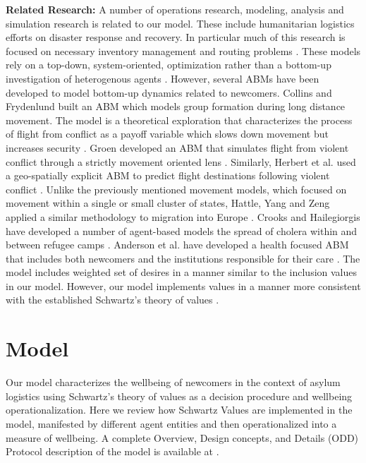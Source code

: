 \documentclass{scspaperproc}
\theoremstyle{scsthe}
\begin{document}
{\bf Related Research:} A number of operations research, modeling, analysis and simulation research is related to our model. These include humanitarian logistics efforts on disaster response and recovery. In particular much of this research is focused on necessary inventory management and routing problems \cite{67}. These models rely on a top-down, system-oriented, optimization rather than a bottom-up investigation of heterogenous agents \cite{13,31,34}. However, several ABMs have been developed to model bottom-up dynamics related to newcomers. Collins and Frydenlund built an ABM which models group formation during long distance movement. The model is a theoretical exploration that characterizes the process of flight from conflict as a payoff variable which slows down movement but increases security \cite{22}. Groen developed an ABM that simulates flight from violent conflict through a strictly movement oriented lens \cite{37}. Similarly, Herbert et al. used a geo-spatially explicit ABM to predict flight destinations following violent conflict \cite{43}. Unlike the previously mentioned movement models, which focused on movement within a single or small cluster of states, Hattle, Yang and Zeng applied a similar methodology to migration into Europe \cite{42}. Crooks and Hailegiorgis have developed a number of agent-based models the spread of cholera within and between refugee camps \cite{28,38}. Anderson et al. have developed a health focused ABM that includes both newcomers and the institutions responsible for their care \cite{4}. The model includes weighted set of desires in a manner similar to the inclusion values in our model. However, our model implements values in a manner more consistent with the established Schwartz's theory of values \cite{phil.masters.thesis}.

\section{Model}

Our model characterizes the wellbeing of newcomers in the context of asylum logistics using Schwartz's theory of values as a decision procedure and wellbeing operationalization. Here we review how Schwartz Values are implemented in the model, manifested by different agent entities and then operationalized into a measure of wellbeing. A complete Overview, Design concepts, and Details (ODD) Protocol description of the model is available at \cite{phil.masters.thesis}.
\end{document}
